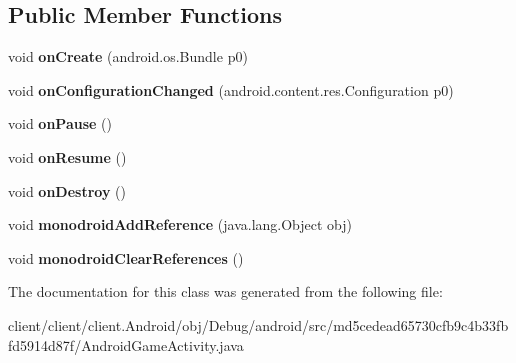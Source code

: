 \subsection*{Public Member Functions}
\begin{DoxyCompactItemize}
\item 
\hypertarget{classmd5cedead65730cfb9c4b33fbfd5914d87f_1_1AndroidGameActivity_acb9d379919f702e0bab1c165efea2c21}{}void {\bfseries on\+Create} (android.\+os.\+Bundle p0)\label{classmd5cedead65730cfb9c4b33fbfd5914d87f_1_1AndroidGameActivity_acb9d379919f702e0bab1c165efea2c21}

\item 
\hypertarget{classmd5cedead65730cfb9c4b33fbfd5914d87f_1_1AndroidGameActivity_a08e599e810b6610dc57494d7dfd41b20}{}void {\bfseries on\+Configuration\+Changed} (android.\+content.\+res.\+Configuration p0)\label{classmd5cedead65730cfb9c4b33fbfd5914d87f_1_1AndroidGameActivity_a08e599e810b6610dc57494d7dfd41b20}

\item 
\hypertarget{classmd5cedead65730cfb9c4b33fbfd5914d87f_1_1AndroidGameActivity_adf06e50de44033e0ff56a48b3f3a3bd3}{}void {\bfseries on\+Pause} ()\label{classmd5cedead65730cfb9c4b33fbfd5914d87f_1_1AndroidGameActivity_adf06e50de44033e0ff56a48b3f3a3bd3}

\item 
\hypertarget{classmd5cedead65730cfb9c4b33fbfd5914d87f_1_1AndroidGameActivity_add44cf82171bc0f1865fe5e4b42c6167}{}void {\bfseries on\+Resume} ()\label{classmd5cedead65730cfb9c4b33fbfd5914d87f_1_1AndroidGameActivity_add44cf82171bc0f1865fe5e4b42c6167}

\item 
\hypertarget{classmd5cedead65730cfb9c4b33fbfd5914d87f_1_1AndroidGameActivity_ad7f56171ab4cd865261a93bca1b6affd}{}void {\bfseries on\+Destroy} ()\label{classmd5cedead65730cfb9c4b33fbfd5914d87f_1_1AndroidGameActivity_ad7f56171ab4cd865261a93bca1b6affd}

\item 
\hypertarget{classmd5cedead65730cfb9c4b33fbfd5914d87f_1_1AndroidGameActivity_ab5acd7a6578172cdc9a2a1797a5dd39c}{}void {\bfseries monodroid\+Add\+Reference} (java.\+lang.\+Object obj)\label{classmd5cedead65730cfb9c4b33fbfd5914d87f_1_1AndroidGameActivity_ab5acd7a6578172cdc9a2a1797a5dd39c}

\item 
\hypertarget{classmd5cedead65730cfb9c4b33fbfd5914d87f_1_1AndroidGameActivity_a02b2f5c21d4ddda6b2dbdbb3ea6834fa}{}void {\bfseries monodroid\+Clear\+References} ()\label{classmd5cedead65730cfb9c4b33fbfd5914d87f_1_1AndroidGameActivity_a02b2f5c21d4ddda6b2dbdbb3ea6834fa}

\end{DoxyCompactItemize}


The documentation for this class was generated from the following file\+:\begin{DoxyCompactItemize}
\item 
client/client/client.\+Android/obj/\+Debug/android/src/md5cedead65730cfb9c4b33fbfd5914d87f/Android\+Game\+Activity.\+java\end{DoxyCompactItemize}
